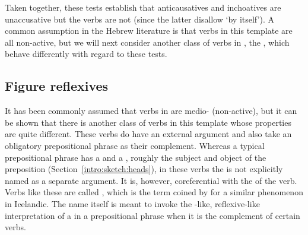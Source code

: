 \begin{exe}
\begin{xlist}
\begin{xlist}
\begin{exe}
\begin{xlist}
\begin{xlist}
\begin{exe}
\begin{xlist}
\begin{xlist}
\begin{exe}
\begin{exe}
\begin{xlist}
\begin{exe}
\begin{exe}
\begin{xlist}
		
 \z
\z 

Taken together, these tests establish that anticausatives and inchoatives are unaccusative but the  verbs are not (since the latter disallow `by itself'). A common assumption in the Hebrew literature is that verbs in this template are all non-active, but we will next consider another class of verbs in {\tnif}, the , which behave differently with regard to these tests.

	\subsection{Figure reflexives} \label{vz:tnif:figrefl}
It has been commonly assumed that verbs in {\tnif} are medio- (non-active), but it can be shown that there is another class of verbs in this template whose properties are quite different. These verbs do have an external argument and also take an obligatory prepositional phrase as their complement. Whereas a typical prepositional phrase has a  and a , roughly the subject and object of the preposition (Section~\ref{intro:sketch:heads}), in these verbs the  is not explicitly named as a separate argument. It is, however, coreferential with the  of the verb. Verbs like these are called \textsc{}, which is the term coined by \cite{wood14nllt} for a similar phenomenon in Icelandic. The name itself is meant to invoke the -like, reflexive-like interpretation of a  in a prepositional phrase when it is the complement of certain verbs.\label{r1:3:2}


\end{xlist}
\end{exe}
\end{exe}
\end{xlist}
\end{exe}
\end{exe}
\end{xlist}
\end{xlist}
\end{exe}
\end{xlist}
\end{xlist}
\end{exe}
\end{xlist}
\end{xlist}
\end{exe}
